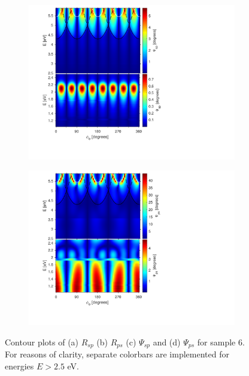 \begin{figure}
    \begin{subfigure}{0.5\textwidth}
        \centering
        \includegraphics[width=\linewidth, trim=1.1cm 1.8cm 6.7cm 0.3cm, clip]{figures/ch4/S6/contour/S6_Psisp.pdf}
        \caption{}
    \end{subfigure}
    \begin{subfigure}{0.5\textwidth}
        \centering
        \includegraphics[width=\linewidth, trim=1.1cm 1.8cm 6.7cm 0.3cm, clip]{figures/ch4/S6/contour/S6_Psips.pdf}
        \caption{}
    \end{subfigure}
    \caption{Contour plots of (a) $R_{sp}$ (b) $R_{ps}$ (c) $\Psi_{sp}$ and (d) $\Psi_{ps}$ for sample 6. For reasons of clarity, separate colorbars are implemented for energies $E>2.5$ eV.}
    \label{fig:S6_contour_Rsp&Rps_Psisp&Psips}
\end{figure}


